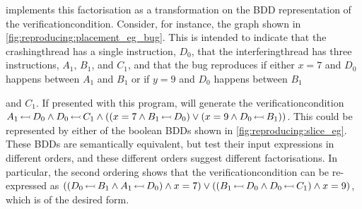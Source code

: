 \Technique{} implements this factorisation as a transformation on the
BDD representation of the \gls{verificationcondition}.  Consider, for
instance, the graph shown in
\autoref{fig:reproducing:placement_eg_bug}.  This is intended to
indicate that the \gls{crashingthread} has a single instruction,
$D_0$, that the \gls{interferingthread} has three instructions, $A_1$,
$B_1$, and $C_1$, and that the bug reproduces if either $x = 7$ and
$D_0$ happens between $A_1$ and $B_1$ or if $y = 9$ and $D_0$ happens
between $B_1$
\begin{wrapfigure}{r}{5.2cm}
  \vspace{-12pt}
  \begin{figgure}
  \caption{}
  \label{fig:reproducing:placement_eg_bug}
  \end{figgure}
  \vspace{-12pt}
\end{wrapfigure}
and $C_1$.  If presented with this program, {\technique}
will generate the \gls{verificationcondition}
$A_1\,{\leftarrowtail}\,D_0 \wedge D_0\,{\leftarrowtail}\,C_1 \wedge ((x =
7 \wedge B_1\,{\leftarrowtail}\,D_0) \vee (x = 9 \wedge
D_0\,{\leftarrowtail}\,B_1))$.  This could be represented by either of
the boolean BDDs shown in \autoref{fig:reproducing:slice_eg}.  These
BDDs are semantically equivalent, but test their input expressions in
different orders, and these different orders suggest different
factorisations.  In particular, the second ordering shows that the
\gls{verificationcondition} can be re-expressed as
$((D_0\,{\leftarrowtail}\,B_1 \wedge A_1\,{\leftarrowtail}\,D_0) \wedge x
= 7) \vee ((B_1\,{\leftarrowtail}\,D_0 \wedge D_0\,{\leftarrowtail}\,C_1)
\wedge x = 9)$, which is of the desired form.

